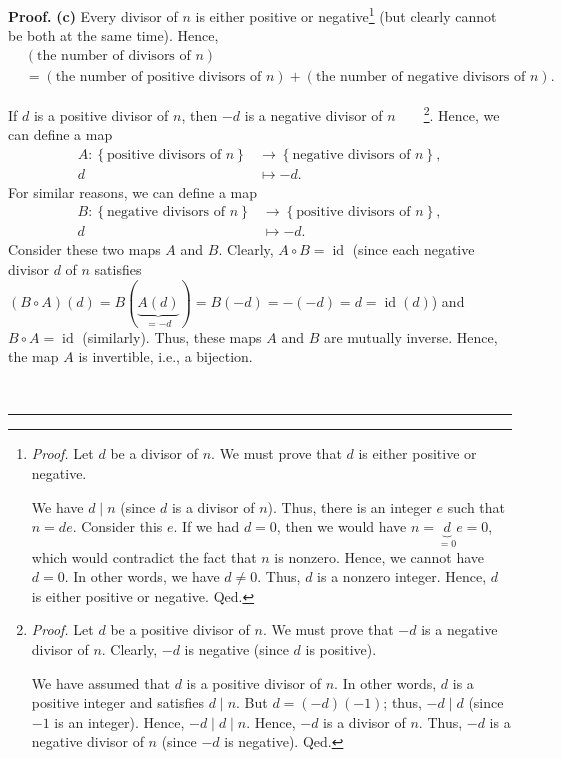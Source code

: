 \documentclass[numbers=enddot,12pt,final,onecolumn,notitlepage]{scrartcl}%
\numberwithin{exer}{subsection}
\theoremstyle{definition}
\newenvironment{proof}[1][Proof]{\noindent\textbf{#1.} }{\ \rule{0.5em}{0.5em}}
\begin{document}
\begin{proof}
\textbf{(c)} Every divisor of $n$ is either positive or
negative\footnote{\textit{Proof.} Let $d$ be a divisor of $n$. We must prove
that $d$ is either positive or negative.
\par
We have $d\mid n$ (since $d$ is a divisor of $n$). Thus, there is an integer
$e$ such that $n=de$. Consider this $e$. If we had $d=0$, then we would have
$n=\underbrace{d}_{=0}e=0$, which would contradict the fact that $n$ is
nonzero. Hence, we cannot have $d=0$. In other words, we have $d\neq0$. Thus,
$d$ is a nonzero integer. Hence, $d$ is either positive or negative. Qed.}
(but clearly cannot be both at the same time). Hence,%
\begin{align*}
&  \left(  \text{the number of divisors of }n\right) \\
&  =\left(  \text{the number of positive divisors of }n\right)  +\left(
\text{the number of negative divisors of }n\right)  .
\end{align*}


If $d$ is a positive divisor of $n$, then $-d$ is a negative divisor of
$n$\ \ \ \ \footnote{\textit{Proof.} Let $d$ be a positive divisor of $n$. We
must prove that $-d$ is a negative divisor of $n$. Clearly, $-d$ is negative
(since $d$ is positive).
\par
We have assumed that $d$ is a positive divisor of $n$. In other words, $d$ is
a positive integer and satisfies $d\mid n$. But $d=\left(  -d\right)  \left(
-1\right)  $; thus, $-d\mid d$ (since $-1$ is an integer). Hence, $-d\mid
d\mid n$. Hence, $-d$ is a divisor of $n$. Thus, $-d$ is a negative divisor of
$n$ (since $-d$ is negative). Qed.}. Hence, we can define a map%
\begin{align*}
A:\left\{  \text{positive divisors of }n\right\}   &  \rightarrow\left\{
\text{negative divisors of }n\right\}  ,\\
d  &  \mapsto-d.
\end{align*}
For similar reasons, we can define a map%
\begin{align*}
B:\left\{  \text{negative divisors of }n\right\}   &  \rightarrow\left\{
\text{positive divisors of }n\right\}  ,\\
d  &  \mapsto-d.
\end{align*}
Consider these two maps $A$ and $B$. Clearly, $A\circ B=\operatorname*{id}$
(since each negative divisor $d$ of $n$ satisfies $\left(  B\circ A\right)
\left(  d\right)  =B\left(  \underbrace{A\left(  d\right)  }_{=-d}\right)
=B\left(  -d\right)  =-\left(  -d\right)  =d=\operatorname*{id}\left(
d\right)  $) and $B\circ A=\operatorname*{id}$ (similarly). Thus, these maps
$A$ and $B$ are mutually inverse. Hence, the map $A$ is invertible, i.e., a bijection.


\end{proof}
\end{document}
